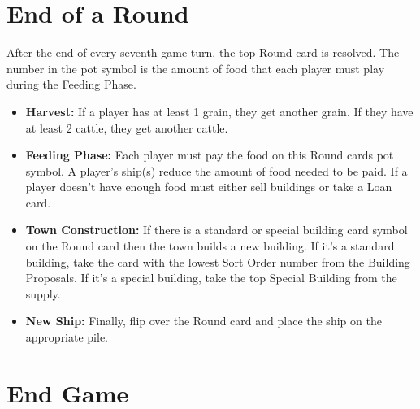 \documentclass[12pt]{article}
\newenvironment{itemizeCustom}
{\begin{itemize}
  \setlength{\itemsep}{1pt}
  \setlength{\parskip}{0pt}
  \setlength{\parsep}{0pt}}
{\end{itemize}}
\begin{document}
\begin{mdframed}[style = customFrame]
\begin{multicols*}{2}
\section*{End of a Round}
After the end of every seventh game turn, the top Round card is resolved. The number in the pot symbol is the amount of food that each player must play during the Feeding Phase.
\begin{itemizeCustom}
	\item \textbf{Harvest:} If a player has at least 1 grain, they get another grain. If they have at least 2 cattle, they get another cattle.
	\item \textbf{Feeding Phase:} Each player must pay the food on this Round cards pot symbol. A player's ship(s) reduce the amount of food needed to be paid. If a player doesn't have enough food must either sell buildings or take a Loan card.
	\item \textbf{Town Construction:} If there is a standard or special building card symbol on the Round card then the town builds a new building. If it's a standard building, take the card with the lowest Sort Order number from the Building Proposals. If it's a special building, take the top Special Building from the supply.
	\item \textbf{New Ship:} Finally, flip over the Round card and place the ship on the appropriate pile.
\end{itemizeCustom}

\section*{End Game}

\end{multicols*}
\end{mdframed}
\end{document}

